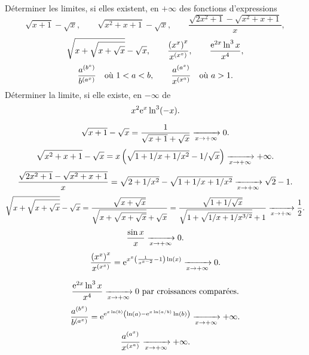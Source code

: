 \documentclass{magnolia}
\begin{document}

Déterminer les limites, si elles existent, en $+\infty$ des fonctions
d'expressions
\[\sqrt{x+1}-\sqrt{x}, \qquad \sqrt{x^2+x+1}-\sqrt{x}, \qquad
  \frac{\sqrt{2x^2+1}-\sqrt{x^2+x+1}}{x},\]
\[\sqrt{x+\sqrt{x+\sqrt{x}}}-\sqrt{x}, \qquad
  \frac{\left(x^x\right)^x}{x^{\left(x^x\right)}}, \qquad \frac{{\rm e}^{2x} \ln^3 x}{x^4},\]
\[\frac{a^{\left(b^x\right)}}{b^{\left(a^x\right)}} \quad \text{où $1<a<b$}, \qquad
  \frac{a^{\left(a^x\right)}}{x^{\left(x^a\right)}} \quad \text{où $a>1$}.\]
Déterminer la limite, si elle existe, en $-\infty$ de 
\[x^2 {\rm e}^{x} \ln^3(-x).\]

\begin{sol}
$$\sqrt{x+1}-\sqrt{x}=\dfrac{1}{\sqrt{x+1}+\sqrt{x}}\xrightarrow[x\rightarrow +\infty]{}{0}.$$
$$\sqrt{x^2+x+1}-\sqrt{x}=x\left(\sqrt{1+1/x+1/x^2}-1/\sqrt{x}\right)\xrightarrow[x\rightarrow +\infty]{}{+\infty}.$$
$$\frac{\sqrt{2x^2+1}-\sqrt{x^2+x+1}}{x}=\sqrt{2+1/x^2}-\sqrt{1+1/x+1/x^2}\xrightarrow[x\rightarrow +\infty]{}{\sqrt{2}-1}.$$
$$\sqrt{x+\sqrt{x+\sqrt{x}}}-\sqrt{x}=\dfrac{\sqrt{x+\sqrt{x}}}{\sqrt{x+\sqrt{x+\sqrt{x}}}+\sqrt{x}}=\dfrac{\sqrt{1+1/\sqrt{x}}}{\sqrt{1+\sqrt{1/x+1/x^{3/2}}}+1}\xrightarrow[x\rightarrow +\infty]{}{\frac{1}{2}}.$$
$$\frac{\sin x}{x}\xrightarrow[x\rightarrow +\infty]{}{0}.$$
$$\frac{\left(x^x\right)^x}{x^{\left(x^x\right)}}={\rm e}^{x^x\left(\frac{1}{x^{x-2}}-1\right)\ln(x)}\xrightarrow[x\rightarrow +\infty]{}{0}.$$

$$\frac{{\rm e}^{2x} \ln^3 x}{x^4}\xrightarrow[x\rightarrow +\infty]{}{0} \text{ par croissances comparées}.$$
$$\frac{a^{\left(b^x\right)}}{b^{\left(a^x\right)}}={\rm e}^{{\rm e}^{x\ln(b)}\left(\ln(a)-{\rm e}^{x\ln(a/b)}\ln(b)\right)}\xrightarrow[x\rightarrow +\infty]{}{+\infty}.$$ 
$$\frac{a^{\left(a^x\right)}}{x^{\left(x^a\right)}}\xrightarrow[x\rightarrow +\infty]{}{+\infty}.$$
\end{sol}
\end{document}
